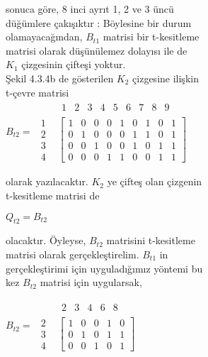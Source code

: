 \documentclass[11pt]{amsbook}
\begin{document}

sonuca göre, 8 inci ayrıt 1, 2 ve 3 üncü\\
düğümlere çakışıktır : Böylesine bir durum\\
olamayacağından, $B_{t1}$ matrisi bir t-kesitleme\\
matrisi olarak düşünülemez dolayısı ile de\\
$K_{1}$ çizgesinin çifteşi yoktur.\\
Şekil 4.3.4b de gösterilen $K_{2}$ çizgesine ilişkin\\
t-çevre matrisi\\

$ 
B_{t2} =
\begin{array}{ccccccccc}
& \begin{array}{ccccccccc}
1 & 2 & 3 & 4 & 5 & 6 & 7 & 8 & 9 
\end{array} \\
\begin{array}{c}
1 \\ 2 \\ 3 \\ 4
\end{array} &
\left[ \begin{array}{ccccccccc}
1 & 0 & 0 & 0 & 1 & 0 & 1 & 0 & 1\\
0 & 1 & 0 & 0 & 0 & 1 & 1 & 0 & 1\\
0 & 0 & 1 & 0 & 0 & 1 & 0 & 1 & 1\\
0 & 0 & 0 & 1 & 1 & 0 & 0 & 1 & 1

\end{array} \right]
\end{array}$

olarak yazılacaktır. $K_{2}$ ye çifteş olan çizgenin\\
t-kesitleme matrisi de\\

\begin{center}

    \hspace{-12cm} $Q_{t2}=B_{t2}$

\end{center}

olacaktır. Öyleyse, $B_{t2}$ matrisini t-kesitleme\\
matrisi olarak gerçekleştirelim. $B_{t1}$ in\\
gerçekleştirimi için uyguladığımız yöntemi bu\\
kez $B_{t2}$ matrisi için uygularsak,

$ 
B_{t2} =
\begin{array}{ccccc}
& \begin{array}{ccccc}
2 & 3 & 4 & 6 & 8
\end{array} \\
\begin{array}{c}
2 \\ 3 \\ 4
\end{array} &
\left[ \begin{array}{ccccc}
1 & 0 & 0 & 1 & 0\\
0 & 1 & 0 & 1 & 1\\
0 & 0 & 1 & 0 & 1

\end{array} \right]
\end{array}$
\end{document}
